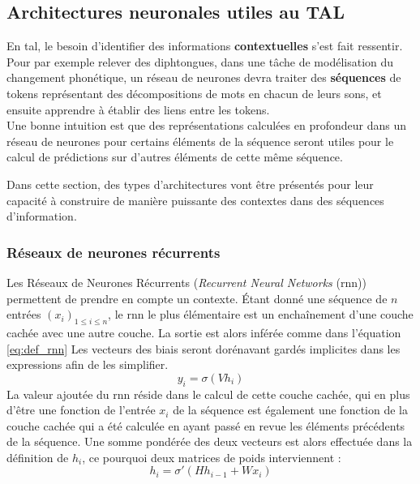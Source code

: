 \documentclass[12pt, twoside]{report}
\begin{document}
\newpage
\subsection{Architectures neuronales utiles au TAL}

En \Gls{tal}, le besoin d'identifier des informations \textbf{contextuelles} s'est fait ressentir. Pour par exemple relever des diphtongues, dans une tâche de modélisation du changement phonétique, un réseau de neurones devra traiter des \textbf{séquences} de \glspl{token} représentant des décompositions de mots en chacun de leurs sons, et ensuite apprendre à établir des liens entre les \glspl{token}.\\
Une bonne intuition est que des représentations calculées en profondeur dans un réseau de neurones pour certains éléments de la séquence seront utiles pour le calcul de prédictions sur d'autres éléments de cette même séquence. 

Dans cette section, des types d'architectures vont être présentés pour leur capacité à construire de manière puissante des contextes dans des séquences d'information.
\subsubsection{Réseaux de neurones récurrents} \label{rnn_def}

Les Réseaux de Neurones Récurrents (\textit{Recurrent Neural Networks} (\Gls{rnn})) permettent de prendre en compte un contexte. Étant donné une séquence de $n$ entrées $(x_i)_{1\leq i \leq n}$, le \Gls{rnn} le plus élémentaire est un enchaînement d'une couche cachée avec une autre couche.\autocite{origine_srnn} La sortie est alors inférée comme dans l'équation \ref{eq:def_rnn} Les vecteurs des biais seront dorénavant gardés implicites dans les expressions afin de les simplifier.
\begin{equation} \label{eq:def_rnn}
    y_i = \sigma(Vh_i)
\end{equation}
La valeur ajoutée du \Gls{rnn} réside dans le calcul de cette couche cachée, qui en plus d'être une fonction de l'entrée $x_i$ de la séquence est également une fonction de la couche cachée qui a été calculée en ayant passé en revue les éléments précédents de la séquence. Une somme pondérée des deux vecteurs est alors effectuée dans la définition de $h_i$, ce pourquoi deux matrices de poids interviennent :
\begin{equation}
    h_i = \sigma'(Hh_{i-1} + Wx_i)
\end{equation}
\end{document}
